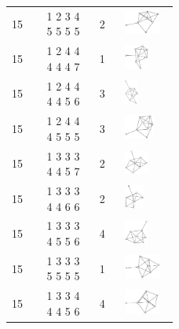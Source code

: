 \begin{footnotesize}
\begin{longtable}{m{0.07\linewidth} m{0.15\linewidth} m{0.05\linewidth} m{0.15\linewidth}}
15 & 1 2 3 4 5 5 5 5 & 2 & \includegraphics[height=0.8cm]{15-universal-graphs/img/degree-sequences-example-graphs/graph-4-8-97}\\
15 & 1 2 4 4 4 4 4 7 & 1 & \includegraphics[height=0.8cm]{15-universal-graphs/img/degree-sequences-example-graphs/graph-4-8-98}\\
15 & 1 2 4 4 4 4 5 6 & 3 & \includegraphics[height=0.8cm]{15-universal-graphs/img/degree-sequences-example-graphs/graph-4-8-99}\\
15 & 1 2 4 4 4 5 5 5 & 3 & \includegraphics[height=0.8cm]{15-universal-graphs/img/degree-sequences-example-graphs/graph-4-8-100}\\
15 & 1 3 3 3 4 4 5 7 & 2 & \includegraphics[height=0.8cm]{15-universal-graphs/img/degree-sequences-example-graphs/graph-4-8-101}\\
15 & 1 3 3 3 4 4 6 6 & 2 & \includegraphics[height=0.8cm]{15-universal-graphs/img/degree-sequences-example-graphs/graph-4-8-102}\\
15 & 1 3 3 3 4 5 5 6 & 4 & \includegraphics[height=0.8cm]{15-universal-graphs/img/degree-sequences-example-graphs/graph-4-8-103}\\
15 & 1 3 3 3 5 5 5 5 & 1 & \includegraphics[height=0.8cm]{15-universal-graphs/img/degree-sequences-example-graphs/graph-4-8-104}\\
15 & 1 3 3 4 4 4 5 6 & 4 & \includegraphics[height=0.8cm]{15-universal-graphs/img/degree-sequences-example-graphs/graph-4-8-105}\\

\end{longtable}
\end{footnotesize}
